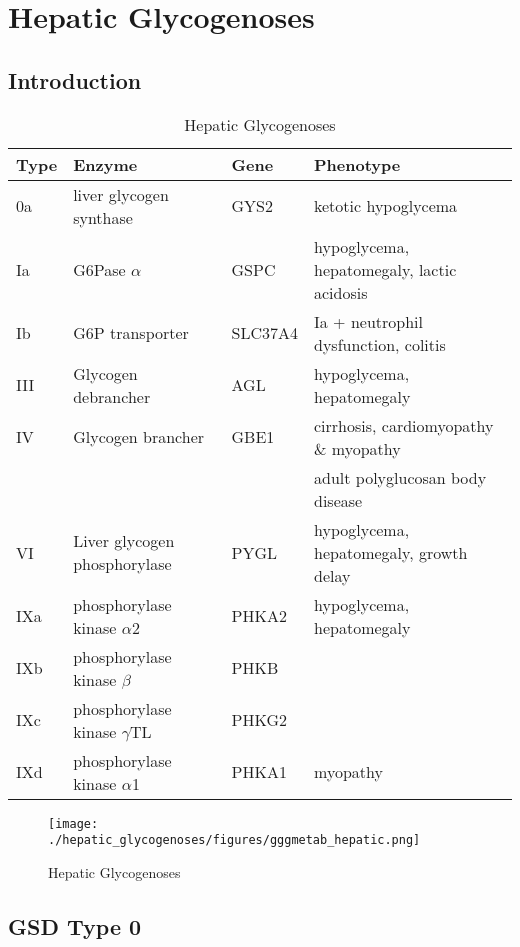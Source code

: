 \documentclass{scrartcl}
\begin{document}
\section{Hepatic Glycogenoses}
\label{sec:orgfb06cd1}
\subsection{Introduction}
\label{sec:org910bc4d}
\begin{table}[htbp]
\caption{\label{tab:org528dfa3}
Hepatic Glycogenoses}
\centering
\begin{tabular}{llll}
Type & Enzyme & Gene & Phenotype\\
\hline
0a & liver glycogen synthase & GYS2 & ketotic hypoglycema\\
Ia & G6Pase \(\alpha\) & GSPC & hypoglycema, hepatomegaly, lactic acidosis\\
Ib & G6P transporter & SLC37A4 & Ia + neutrophil dysfunction, colitis\\
III & Glycogen debrancher & AGL & hypoglycema, hepatomegaly\\
IV & Glycogen brancher & GBE1 & cirrhosis, cardiomyopathy \& myopathy\\
 &  &  & adult polyglucosan body disease\\
VI & Liver glycogen phosphorylase & PYGL & hypoglycema, hepatomegaly, growth delay\\
IXa & phosphorylase kinase \(\alpha\)2 & PHKA2 & hypoglycema, hepatomegaly\\
IXb & phosphorylase kinase \(\beta\) & PHKB & \\
IXc & phosphorylase kinase \(\gamma\)TL & PHKG2 & \\
IXd & phosphorylase kinase \(\alpha\)1 & PHKA1 & myopathy\\
\end{tabular}
\end{table}

\begin{figure}[htbp]
\centering
\texttt{[image: ./hepatic\_glycogenoses/figures/gggmetab\_hepatic.png]}
\caption[Hepatic Glycogenoses]{\label{fig:org929b7fe}
Hepatic Glycogenoses}
\end{figure}

\subsection{GSD Type 0}
\label{sec:org0a42f0e}
\end{document}

